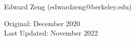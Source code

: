 \def\topic{Field Extensions}



    \begin{center}
        \color{blue}
        \textsf{Edward Zeng (edwardzeng@berkeley.edu)}

        \color{red}
        \textsf{Original: December 2020 \\}
        \textsf{Last Updated: November 2022}
    \end{center}

    
    
    
    
    
    
    


